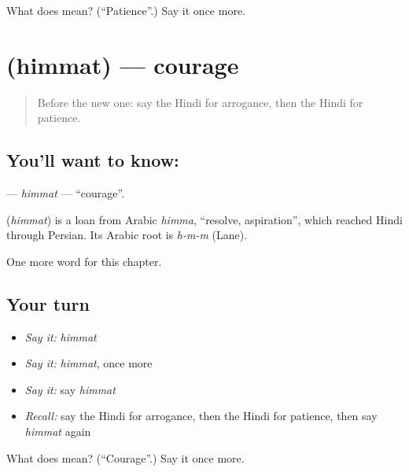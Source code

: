 \begin{tcolorbox}[breakable,colback=teal!4,colframe=teal!35!black,title={Before you move on}]
What does  mean? (\textquotedblleft{}Patience\textquotedblright{}.) Say it once more.
\end{tcolorbox}
\section[\texorpdfstring{\hi{हिम्मत} (himmat)}{हिम्मत (himmat)}]{ (himmat) — courage}

\label{lesson:HI-C258-himmat}



\begin{quote}
Before the new one: say the Hindi for arrogance, then the Hindi for patience.
\end{quote}

\subsection*{You'll want to know: }
\textbf{} — \emph{himmat} — \textquotedblleft{}courage\textquotedblright{}.

\begin{cousinweb}
\textbf{} (\emph{himmat}) is a loan from Arabic \emph{himma}, \textquotedblleft{}resolve, aspiration\textquotedblright{}, which reached Hindi through Persian. Its Arabic root is \emph{h-m-m} (Lane).
\end{cousinweb}

\begin{grammarlens}[title={What you've built}]
One more word for this chapter.
\end{grammarlens}

\subsection*{Your turn}
\begin{itemize}
\raggedright
  \item \emph{Say it:} \emph{himmat}
  \item \emph{Say it:} \emph{himmat}, once more
  \item \emph{Say it:} say \emph{himmat}
  \item \emph{Recall:} say the Hindi for arrogance, then the Hindi for patience, then say \emph{himmat} again
\end{itemize}

\begin{tcolorbox}[breakable,colback=teal!4,colframe=teal!35!black,title={Before you move on}]
What does  mean? (\textquotedblleft{}Courage\textquotedblright{}.) Say it once more.
\end{tcolorbox}
